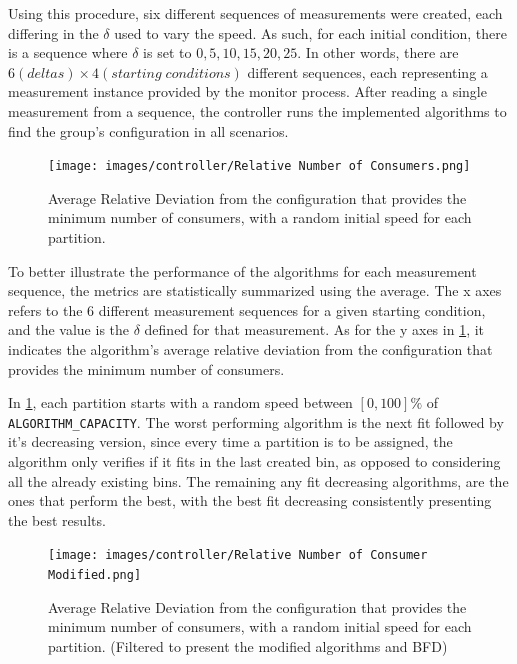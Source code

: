 Using this procedure, six different sequences of measurements were created, each
    differing in the $\delta$ used to vary the speed. As such, for each initial
    condition, there is a sequence where $\delta$ is set to $0, 5, 10, 15, 20,
    25$. In other words, there are $6 (deltas) \times 4 (starting\; conditions)$
    different sequences, each representing a measurement instance provided by
    the monitor process. After reading a single measurement from a sequence, the
    controller runs the implemented algorithms to find the group's configuration
    in all scenarios.

\begin{figure}[H] \centering
    \texttt{[image: images/controller/Relative Number of
    Consumers.png]} \caption{Average Relative Deviation from the configuration
    that provides the minimum number of consumers, with a random initial speed
    for each partition.} \label{fig:relative_nconsumers} \end{figure}

To better illustrate the performance of the algorithms for each measurement
    sequence, the metrics are statistically summarized using the average. The x
    axes refers to the 6 different measurement sequences for a given starting
    condition, and the value is the $\delta$ defined for that measurement. As
    for the y axes in \ref{fig:relative_nconsumers}, it indicates the
    algorithm's average relative deviation from the configuration that provides
    the minimum number of consumers.

In \ref{fig:relative_nconsumers}, each partition starts with a random speed
    between $[0,100]\%$ of \lstinline[language=Python]{ALGORITHM_CAPACITY}. The
    worst performing algorithm is the next fit followed by it's decreasing
    version, since every time a partition is to be assigned, the algorithm only
    verifies if it fits in the last created bin, as opposed to considering all
    the already existing bins. The remaining any fit decreasing algorithms, are
    the ones that perform the best, with the best fit decreasing consistently
    presenting the best results. 

\begin{figure}[H] \centering
    \texttt{[image: images/controller/Relative Number of
    Consumer Modified.png]} \caption{Average Relative Deviation from the
    configuration that provides the minimum number of consumers, with a random
    initial speed for each partition. (Filtered to present the modified
    algorithms and BFD)} \label{fig:relative_nconsumers_modified} \end{figure}

